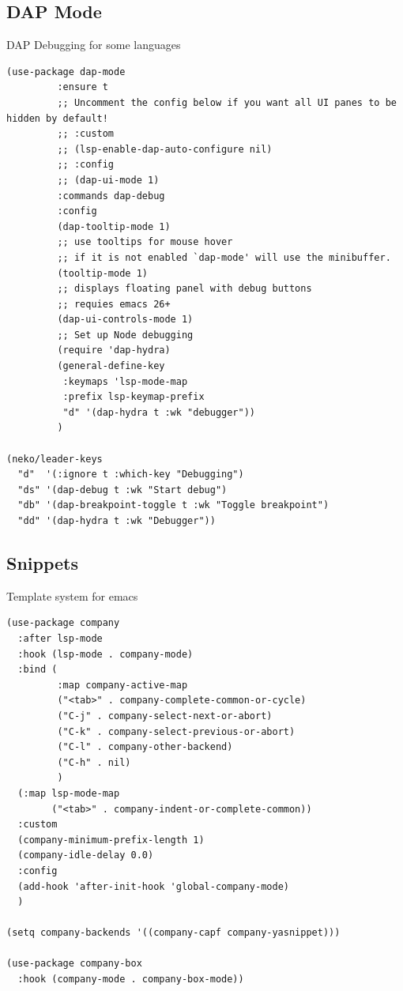 \documentclass[11pt]{article}
\begin{document}
\subsection{DAP Mode}
\label{sec:orgfb3a12d}

DAP Debugging for some languages

\begin{verbatim}
(use-package dap-mode
         :ensure t
         ;; Uncomment the config below if you want all UI panes to be hidden by default!
         ;; :custom
         ;; (lsp-enable-dap-auto-configure nil)
         ;; :config
         ;; (dap-ui-mode 1)
         :commands dap-debug
         :config
         (dap-tooltip-mode 1)
         ;; use tooltips for mouse hover
         ;; if it is not enabled `dap-mode' will use the minibuffer.
         (tooltip-mode 1)
         ;; displays floating panel with debug buttons
         ;; requies emacs 26+
         (dap-ui-controls-mode 1)
         ;; Set up Node debugging
         (require 'dap-hydra)
         (general-define-key
          :keymaps 'lsp-mode-map
          :prefix lsp-keymap-prefix
          "d" '(dap-hydra t :wk "debugger"))
         )

(neko/leader-keys
  "d"  '(:ignore t :which-key "Debugging")
  "ds" '(dap-debug t :wk "Start debug")
  "db" '(dap-breakpoint-toggle t :wk "Toggle breakpoint")
  "dd" '(dap-hydra t :wk "Debugger"))
\end{verbatim}

\subsection{Snippets}
\label{sec:org549fc7d}

Template system for emacs

\begin{verbatim}
(use-package company
  :after lsp-mode
  :hook (lsp-mode . company-mode)
  :bind (
         :map company-active-map
         ("<tab>" . company-complete-common-or-cycle)
         ("C-j" . company-select-next-or-abort)
         ("C-k" . company-select-previous-or-abort)
         ("C-l" . company-other-backend)
         ("C-h" . nil)
         )
  (:map lsp-mode-map
        ("<tab>" . company-indent-or-complete-common))
  :custom
  (company-minimum-prefix-length 1)
  (company-idle-delay 0.0)
  :config
  (add-hook 'after-init-hook 'global-company-mode)
  )

(setq company-backends '((company-capf company-yasnippet)))

(use-package company-box
  :hook (company-mode . company-box-mode))

\end{verbatim}
\end{document}

